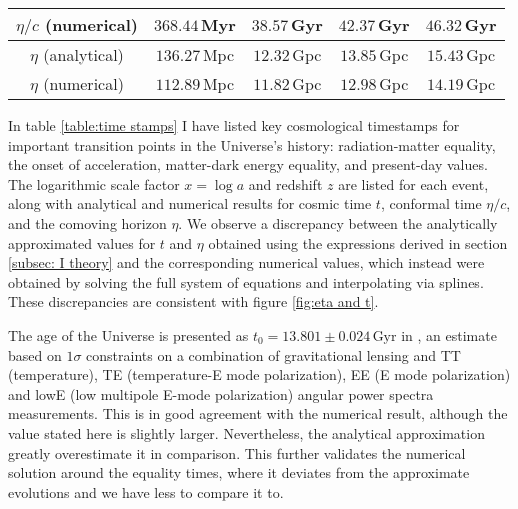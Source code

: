 \documentclass{aa}
\begin{document}
\begin{table*}
\begin{tabular}{| c || c | c | c | c |}
     $\eta/c$ (numerical) & \hspace{25pt}$368.44\,$Myr & \hspace{20.5pt}$38.57\,$Gyr & \hspace{19pt}$42.37\,$Gyr & \hspace{25pt}$46.32\,$Gyr \\ 
     \hline 
     \hspace{5.5pt}$\eta$ \hspace{3.5pt}(analytical) & \hspace{25pt}$136.27\,$Mpc & \hspace{20.5pt}$12.32\,$Gpc & \hspace{19pt}$13.85\,$Gpc & \hspace{25pt}$15.43\,$Gpc \\ 
     \hspace{5.5pt}$\eta$ \hspace{3.5pt}(numerical) & \hspace{25pt}$112.89\,$Mpc & \hspace{20.5pt}$11.82\,$Gpc & \hspace{19pt}$12.98\,$Gpc & \hspace{25pt}$14.19\,$Gpc \\ 
  \hline                                   %
  \end{tabular}
  \end{table*}

In table \ref{table:time stamps} I have listed key cosmological timestamps for important transition points in the Universe's history: radiation-matter equality, the onset of acceleration, matter-dark energy equality, and present-day values. The logarithmic scale factor $x = \log a$ and redshift $z$ are listed for each event, along with analytical and numerical results for cosmic time $t$, conformal time $\eta/c$, and the comoving horizon $\eta$. We observe a discrepancy between the analytically approximated values for $t$ and $\eta$ obtained using the expressions derived in section \ref{subsec: I theory} and the corresponding numerical values, which instead were obtained by solving the full system of equations and interpolating via splines. These discrepancies are consistent with figure \ref{fig:eta and t}.

The age of the Universe is presented as $t_0=13.801\pm0.024\,\text{Gyr}$ in \citet{Planck}, an estimate based on $1\sigma$ constraints on a combination of gravitational lensing and TT (temperature), TE (temperature-E mode polarization), EE (E mode polarization) and lowE (low multipole E-mode polarization) angular power spectra measurements. This is in good agreement with the numerical result, although the value stated here is slightly larger. Nevertheless, the analytical approximation greatly overestimate it in comparison. This further validates the numerical solution around the equality times, where it deviates from the approximate evolutions and we have less to compare it to.
\end{document}

